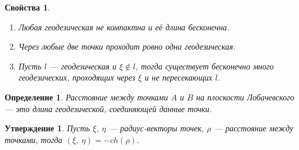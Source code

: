 \documentclass[12pt]{article}
\newcommand\tab[1][.5cm]{\hspace*{#1}}
\theoremstyle{plain}
\newtheorem{subtheorem}{Утверждение}[section]
\newtheorem{propertes}{Свойства}
\newtheorem{definition}{Определение}[section]
\begin{document}
    \begin{propertes}\tab
        \begin{enumerate}
            \item Любая геодезическая не компактна и её длина бесконечна.
            \item Через любые две точки проходит ровно одна геодезическая.
            \item Пусть $l$ --- геодезическая и $\xi\notin l$, тогда существует бесконечно много геодезических, проходящих через $\xi$ и не пересекающих $l$.
        \end{enumerate}
    \end{propertes}
    \begin{definition}
        Расстояние между точками $A$ и $B$ на плоскости Лобачевского --- это длина геодезической, соединяющей данные точки.
    \end{definition}
    \begin{subtheorem}
        Пусть $\xi$, $\eta$ --- радиус-векторы точек, $\rho$ --- расстояние между точками, тогда $(\xi, \ \eta)=-ch(\rho)$.
    \end{subtheorem}
\end{document}
